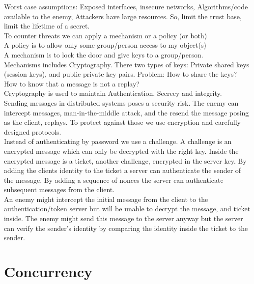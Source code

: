 Worst case assumptions: Exposed interfaces, insecure networks, Algorithms/code available to the enemy, Attackers have large resources. So, limit the trust base, limit the lifetime of a secret.\\

To counter threats we can apply a mechanism or a policy (or both)\\
	
A policy is to allow only some group/person access to my object(s)\\

A mechanism is to lock the door and give keys to a group/person.\\

Mechanisms includes Cryptography. There two types of keys: Private shared keys (session keys), and public private key pairs. Problem: How to share the keys? How to know that a message is not a replay?\\

Cryptography is used to maintain Authentication, Secrecy and integrity. \\

Sending messages in distributed systems poses a security risk. The enemy can intercept messages, man-in-the-middle attack, and the resend the message posing as the client, replays. To protect against those we use encryption and carefully designed protocols. \\

Instead of authenticating by password we use a challenge. A challenge is an encrypted message which can only be decrypted with the right key. Inside the encrypted message is a ticket, another challenge, encrypted in the server key. By adding the clients identity to the ticket a server can authenticate the sender of the message. By adding a sequence of nonces the server can authenticate subsequent messages from the client.\\

An enemy might intercept the initial message from the client to the authentication/token server but will be unable to decrypt the message, and ticket inside. The enemy might send this message to the server anyway but the server can verify the sender's identity by comparing the identity inside the ticket to the sender. \\


\section{Concurrency}
